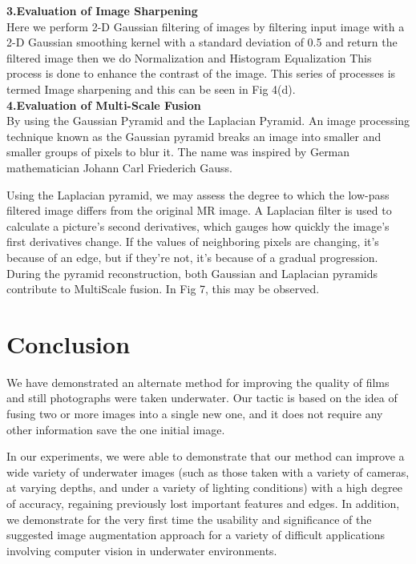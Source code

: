 \documentclass[conference]{IEEEtran}
\begin{document}
\textbf{3.Evaluation of Image Sharpening}\\
Here we perform 2-D Gaussian filtering of images by filtering input image with a 2-D Gaussian smoothing kernel with a standard deviation of 0.5 and return the filtered image then we do Normalization and Histogram Equalization This process is done to enhance the contrast of the image. This series of processes is termed Image sharpening and this can be seen in Fig 4(d). \\

\textbf{4.Evaluation of Multi-Scale Fusion}\\
By using the Gaussian Pyramid and the Laplacian Pyramid. An image processing technique known as the Gaussian pyramid breaks an image into smaller and smaller groups of pixels to blur it. The name was inspired by German mathematician Johann Carl Friederich Gauss.\\
\par
Using the Laplacian pyramid, we may assess the degree to which the low-pass filtered image differs from the original MR image. A Laplacian filter is used to calculate a picture's second derivatives, which gauges how quickly the image's first derivatives change. If the values of neighboring pixels are changing, it's because of an edge, but if they're not, it's because of a gradual progression. During the pyramid reconstruction, both Gaussian and Laplacian pyramids contribute to MultiScale fusion. In Fig 7, this may be observed.\\

\section{Conclusion}
We have demonstrated an alternate method for improving the quality of films and still photographs were taken underwater. Our tactic is based on the idea of fusing two or more images into a single new one, and it does not require any other information save the one initial image. \\
\par
In our experiments, we were able to demonstrate that our method can improve a wide variety of underwater images (such as those taken with a variety of cameras, at varying depths, and under a variety of lighting conditions) with a high degree of accuracy, regaining previously lost important features and edges. In addition, we demonstrate for the very first time the usability and significance of the suggested image augmentation approach for a variety of difficult applications involving computer vision in underwater environments.



\vspace{12pt}
\end{document}

